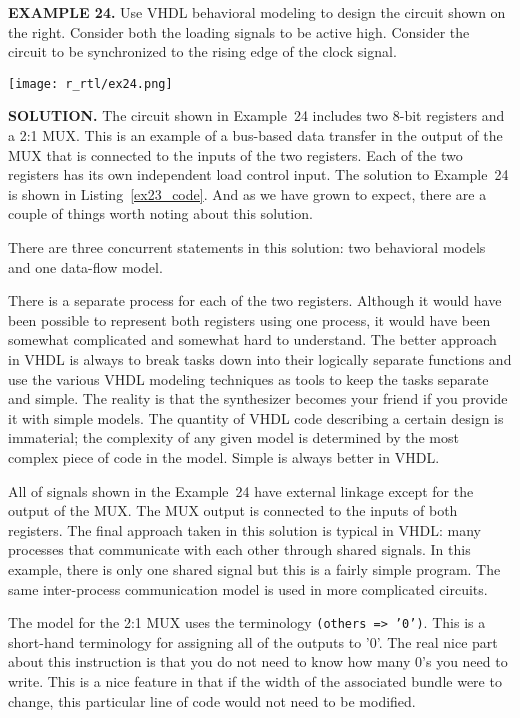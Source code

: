 \begin{leftbar}
\begin{minipage}[t]{0.5\textwidth}
\vspace{10pt}
\noindent
\textbf{EXAMPLE 24.}
Use VHDL behavioral modeling to design the circuit shown on the right. Consider both the loading signals to be active high. Consider the circuit to be synchronized to the rising edge of the clock signal.
\end{minipage}
\begin{minipage}[t]{0.47\textwidth}
\vspace{0pt}\raggedright
    \centering
	\texttt{[image: r\_rtl/ex24.png]}
\end{minipage}
\end{leftbar}
\noindent
\textbf{SOLUTION.} The circuit shown in Example~24 includes two 8-bit registers and a 2:1 MUX. This is an example of a bus-based data transfer in the output of the MUX that is connected to the inputs of the two registers. Each of the two registers has its own independent load control input. The solution to Example~24 is shown in Listing~\ref{ex23_code}. And as we have grown to expect, there are a couple of things worth noting about this solution.
\begin{my_list}
\item There are three concurrent statements in this solution: two behavioral models and one data-flow model.

\item There is a separate process for each of the two registers. Although it would have been possible to represent both registers using one process, it would have been somewhat complicated and somewhat hard to understand. The better approach in VHDL is always to break tasks down into their logically separate functions and use the various VHDL modeling techniques as tools to keep the tasks separate and simple. The reality is that the synthesizer becomes your friend if you provide it with simple models. The quantity of VHDL code describing a certain design is immaterial; the complexity of any given model is determined by the most complex piece of code in the model. Simple is always better in VHDL.

\item All of signals shown in the Example~24 have external linkage except for the output of the MUX. The MUX output is connected to the inputs of both registers. The final approach taken in this solution is typical in VHDL: many processes that communicate with each other through shared signals. In this example, there is only one shared signal but this is a fairly simple program. The same inter-process communication model is used in more complicated circuits.

\item The model for the 2:1 MUX uses the terminology \texttt{(others => '0')}. This is a short-hand terminology for assigning all of the outputs to '0'. The real nice part about this instruction is that you do not need to know how many 0’s you need to write. This is a nice feature in that if the width of the associated bundle were to change, this particular line of code would not need to be modified.
\end{my_list}


